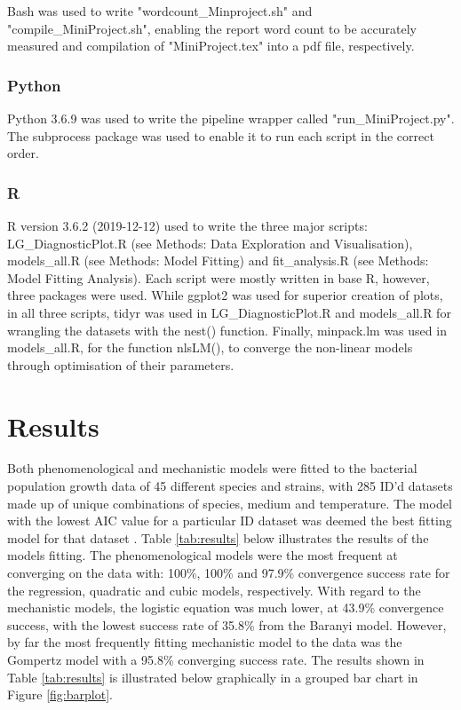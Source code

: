 \documentclass[11pt, a4paper]{article} %
\begin{document}
Bash was used to write "wordcount\_Minproject.sh" and "compile\_MiniProject.sh", enabling the report word count to be accurately measured and compilation of "MiniProject.tex" into a pdf file, respectively.

\subsubsection{Python}

Python 3.6.9 was used to write the pipeline wrapper called "run\_MiniProject.py". The subprocess package was used to enable it to run each script in the correct order. 

\subsubsection{R}

R version 3.6.2 (2019-12-12) used to write the three major scripts: LG\_DiagnosticPlot.R (see Methods: Data Exploration and Visualisation), models\_all.R (see Methods: Model Fitting) and fit\_analysis.R (see Methods: Model Fitting Analysis). Each script were mostly written in base R, however, three packages were used. While ggplot2 was used for superior creation of plots, in all three scripts, tidyr was used in LG\_DiagnosticPlot.R and models\_all.R for wrangling the datasets with the nest() function. Finally, minpack.lm was used in models\_all.R, for the function nlsLM(), to converge the non-linear models through optimisation of their parameters.

\section{Results}

Both phenomenological and mechanistic models were fitted to the bacterial population growth data of 45 different species and strains, with 285 ID'd datasets made up of unique combinations of species, medium and temperature. The model with the lowest AIC value for a particular ID dataset was deemed the best fitting model for that dataset \citep{RN112}. Table \ref{tab:results} below illustrates the results of the models fitting. The phenomenological models were the most frequent at converging on the data with: 100\%, 100\% and 97.9\% convergence success rate for the regression, quadratic and cubic models, respectively. With regard to the mechanistic models, the logistic equation was much lower, at 43.9\% convergence success, with the lowest success rate of 35.8\% from the Baranyi model. However, by far the most frequently fitting mechanistic model to the data was the Gompertz model with a 95.8\% converging success rate. The results shown in Table \ref{tab:results} is illustrated below graphically in a grouped bar chart in Figure \ref{fig:barplot}.
\end{document}
